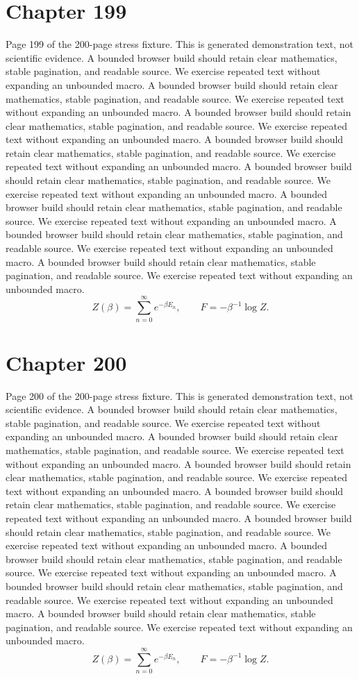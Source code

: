 \documentclass[11pt]{article}
\begin{document}
\section*{Chapter 199}
Page 199 of the 200-page stress fixture. This is generated demonstration text, not scientific evidence.
A bounded browser build should retain clear mathematics, stable pagination, and readable source. We exercise repeated text without expanding an unbounded macro.
A bounded browser build should retain clear mathematics, stable pagination, and readable source. We exercise repeated text without expanding an unbounded macro.
A bounded browser build should retain clear mathematics, stable pagination, and readable source. We exercise repeated text without expanding an unbounded macro.
A bounded browser build should retain clear mathematics, stable pagination, and readable source. We exercise repeated text without expanding an unbounded macro.
A bounded browser build should retain clear mathematics, stable pagination, and readable source. We exercise repeated text without expanding an unbounded macro.
A bounded browser build should retain clear mathematics, stable pagination, and readable source. We exercise repeated text without expanding an unbounded macro.
A bounded browser build should retain clear mathematics, stable pagination, and readable source. We exercise repeated text without expanding an unbounded macro.
A bounded browser build should retain clear mathematics, stable pagination, and readable source. We exercise repeated text without expanding an unbounded macro.
\[Z(\beta)=\sum_{n=0}^{\infty}e^{-\beta E_n},\qquad F=-\beta^{-1}\log Z.\]
\newpage
\section*{Chapter 200}
Page 200 of the 200-page stress fixture. This is generated demonstration text, not scientific evidence.
A bounded browser build should retain clear mathematics, stable pagination, and readable source. We exercise repeated text without expanding an unbounded macro.
A bounded browser build should retain clear mathematics, stable pagination, and readable source. We exercise repeated text without expanding an unbounded macro.
A bounded browser build should retain clear mathematics, stable pagination, and readable source. We exercise repeated text without expanding an unbounded macro.
A bounded browser build should retain clear mathematics, stable pagination, and readable source. We exercise repeated text without expanding an unbounded macro.
A bounded browser build should retain clear mathematics, stable pagination, and readable source. We exercise repeated text without expanding an unbounded macro.
A bounded browser build should retain clear mathematics, stable pagination, and readable source. We exercise repeated text without expanding an unbounded macro.
A bounded browser build should retain clear mathematics, stable pagination, and readable source. We exercise repeated text without expanding an unbounded macro.
A bounded browser build should retain clear mathematics, stable pagination, and readable source. We exercise repeated text without expanding an unbounded macro.
\[Z(\beta)=\sum_{n=0}^{\infty}e^{-\beta E_n},\qquad F=-\beta^{-1}\log Z.\]
\end{document}

